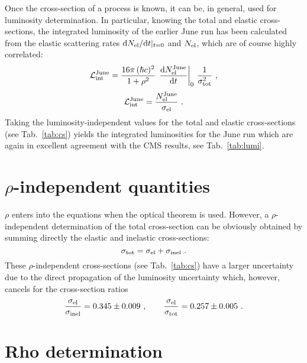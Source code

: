 \documentclass[doublecol]{epl/epl2}
\def\d{{\rm d}}
\begin{document}
Once the cross-section of a process is known, it can be, in general, used for luminosity determination. In particular, knowing the total and elastic cross-sections, the integrated luminosity of the earlier June run \cite{epl96} has been calculated from the elastic scattering rates $\d N_{\rm el}/\d t|_{t=0}$ and $N_{\rm el}$, which are of course highly correlated:
\begin{equation}
\label{eq:lumi jun tot}
{\cal L}_{\rm int}^{\rm June} =  {16\pi\, (\hbar c)^2\over 1 + \rho^2}\, \left. \d N_{\rm el}^{\rm June}\over\d t\right|_0\, {1\over \sigma_{\rm tot}^2}\ ,
\end{equation}
\begin{equation}
\label{eq:lumi jun el}
{\cal L}_{\rm int}^{\rm June} = {N_{\rm el}^{\rm June}\over \sigma_{\rm el}}\ .
\end{equation}
Taking the luminosity-independent values for the total and elastic cross-sections (see Tab.~\ref{tab:cs}) yields the integrated luminosities for the June run which are again in excellent agreement with the CMS results, see Tab.~\ref{tab:lumi}.

\section{$\rho$-independent quantities}

$\rho$ enters into the equations when the optical theorem is used. However, a $\rho$-independent determination of the total cross-section can be obviously obtained by summing directly the elastic \cite{P1} and inelastic  \cite{P2} cross-sections:
\begin{equation}
\label{eq:m rho indep}
\sigma_{\rm tot} = \sigma_{\rm el} + \sigma_{\rm inel}\ .
\end{equation}
These $\rho$-independent cross-sections (see Tab.~\ref{tab:cs}) have a larger uncertainty due to the direct propagation of the luminosity uncertainty which, however, cancels for the cross-section ratios
$$
{\sigma_{\rm el} \over \sigma_{\rm inel}} = 0.345 \pm 0.009\ ,\qquad {\sigma_{\rm el}\over \sigma_{\rm tot}} = 0.257 \pm 0.005\ .
$$


\section{Rho determination}
\end{document}
